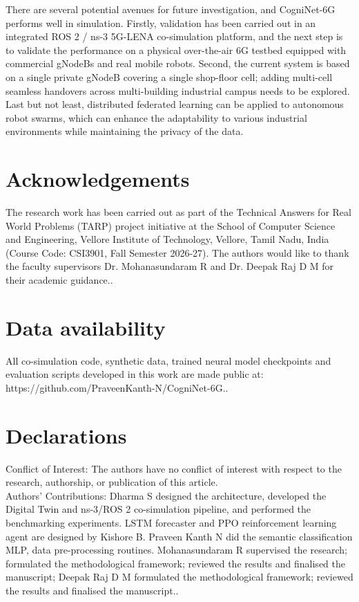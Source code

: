 \documentclass[twocolumn,10pt,twoside]{article}
\begin{document}
There are several potential avenues for future investigation, and CogniNet-6G performs well in simulation. Firstly, validation has been carried out in an integrated ROS 2 / ns-3 5G-LENA co-simulation platform, and the next step is to validate the performance on a physical over-the-air 6G testbed equipped with commercial gNodeBs and real mobile robots. Second, the current system is based on a single private gNodeB covering a single shop-floor cell; adding multi-cell seamless handovers across multi-building industrial campus needs to be explored. Last but not least, distributed federated learning can be applied to autonomous robot swarms, which can enhance the adaptability to various industrial environments while maintaining the privacy of the data.

\section*{Acknowledgements}
\small
\noindent The research work has been carried out as part of the Technical Answers for Real World Problems (TARP) project initiative at the School of Computer Science and Engineering, Vellore Institute of Technology, Vellore, Tamil Nadu, India (Course Code: CSI3901, Fall Semester 2026-27). The authors would like to thank the faculty supervisors Dr. Mohanasundaram R and Dr. Deepak Raj D M for their academic guidance..

\section*{Data availability}
\small
\noindent All co-simulation code, synthetic data, trained neural model checkpoints and evaluation scripts developed in this work are made public at: https://github.com/PraveenKanth-N/CogniNet-6G..

\section*{Declarations}
\small
\noindent Conflict of Interest: The authors have no conflict of interest with respect to the research, authorship, or publication of this article.\\ \noindent Authors' Contributions: Dharma S designed the architecture, developed the Digital Twin and ns-3/ROS 2 co-simulation pipeline, and performed the benchmarking experiments. LSTM forecaster and PPO reinforcement learning agent are designed by Kishore B. Praveen Kanth N did the semantic classification MLP, data pre-processing routines. Mohanasundaram R supervised the research; formulated the methodological framework; reviewed the results and finalised the manuscript; Deepak Raj D M formulated the methodological framework; reviewed the results and finalised the manuscript..
\end{document}
